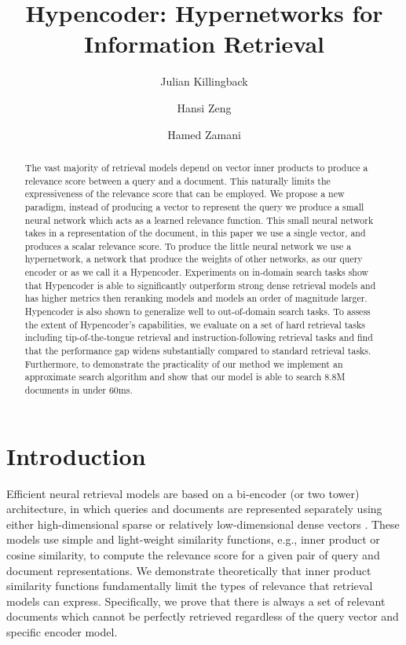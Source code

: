 \documentclass[sigconf,]{acmart}
\title{Hypencoder: Hypernetworks for Information Retrieval}
\author{Julian Killingback}
\affiliation{%
  \institution{University of Massachusetts Amherst}
  \city{Amherst}
  \state{MA}
  \country{USA}
}
\author{Hansi Zeng}
\affiliation{%
  \institution{University of Massachusetts Amherst}
  \city{Amherst}
  \state{MA}
  \country{USA}
}
\author{Hamed Zamani}
\affiliation{%
  \institution{University of Massachusetts Amherst}
  \city{Amherst}
  \state{MA}
  \country{USA}
}
\begin{document}
\newcommand{\name}{Hypencoder}
\newcommand{\mininame}{q-net}
\newcommand{\hyperheadlayer}{hyperhead layer}
\newcommand{\todo}[1]{\textcolor{red!70}{TODO: #1}}
\newcommand{\ItemEncoderName}{$\Psi$}
\newcommand{\ItemRepsName}{$E_d$}
\newcommand{\QueryEncoderName}{$\Phi$}
\newcommand{\HyperHeadName}{hyper-head}


\begin{abstract}
The vast majority of retrieval models depend on vector inner products to produce a relevance score between a query and a document. This naturally limits the expressiveness of the relevance score that can be employed. We propose a new paradigm, instead of producing a vector to represent the query we produce a small neural network which acts as a learned relevance function. This small neural network takes in a representation of the document, in this paper we use a single vector, and produces a scalar relevance score. To produce the little neural network we use a hypernetwork, a network that produce the weights of other networks, as our query encoder or as we call it a Hypencoder. Experiments on in-domain search tasks show that Hypencoder is able to significantly outperform strong dense retrieval models and has higher metrics then reranking models and models an order of magnitude larger. Hypencoder is also shown to generalize well to out-of-domain search tasks. To assess the extent of Hypencoder's capabilities, we evaluate on a set of hard retrieval tasks including tip-of-the-tongue retrieval and instruction-following retrieval tasks and find that the performance gap widens substantially compared to standard retrieval tasks. Furthermore, to demonstrate the practicality of our method we implement an approximate search algorithm and show that our model is able to search 8.8M documents in under 60ms.
\end{abstract}
\maketitle


\section{Introduction}
Efficient neural retrieval models are based on a bi-encoder (or two tower) architecture, in which queries and documents are represented separately using either high-dimensional sparse \cite{SNRM,SPLADE, SPLADE++} or relatively low-dimensional dense vectors \cite{DPR,ANCE,ColBERT_v1, CL-DRD, CoCondensor}. These models use simple and light-weight similarity functions, e.g., inner product or cosine similarity, to compute the relevance score for a given pair of query and document representations. We demonstrate theoretically that inner product similarity functions fundamentally limit the types of relevance that retrieval models can express. Specifically, we prove that there is always a set of relevant documents which cannot be perfectly retrieved regardless of the query vector and specific encoder model.
\end{document}
